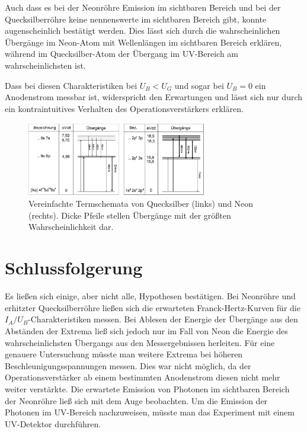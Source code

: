 \documentclass[
	a4paper,
	12pt,
	pagesize,
	ngerman
]{scrartcl}
\begin{document}
	Auch dass es bei der Neonröhre Emission im sichtbaren Bereich und bei der Quecksilberröhre keine nennenswerte im sichtbaren Bereich gibt, konnte augenscheinlich bestätigt werden.
	Dies lässt sich durch die wahrscheinlichen Übergänge im Neon-Atom mit Wellenlängen im sichtbaren Bereich erklären, während im Quecksilber-Atom der Übergang im UV-Bereich am wahrscheinlichsten ist.
	
	Dass bei diesen Charakteristiken bei $U_B < U_G$ und sogar bei $U_B=0$ ein Anodenstrom messbar ist, widerspricht den Erwartungen und lässt sich nur durch ein kontraintuitives Verhalten des Operationsverstärkers erklären.
	
	\begin{figure}[H]
		\includegraphics[width=0.7\textwidth]{Term}
		\centering
		\caption{Vereinfachte Termschemata von Quecksilber (links) und Neon
			(rechts). Dicke Pfeile stellen Übergänge mit der größten Wahrscheinlichkeit
			dar.\cite{Roehren} }
		\label{Term}
		\centering
	\end{figure}
	
	
	\section{Schlussfolgerung}
	Es ließen sich einige, aber nicht alle, Hypothesen bestätigen.
	Bei Neonröhre und erhitzter Quecksilberröhre ließen sich die erwarteten Franck-Hertz-Kurven für die $I_A/U_B$-Charakteristiken messen.
	Bei Ablesen der Energie der Übergänge aus den Abständen der Extrema ließ sich jedoch nur im Fall von Neon die Energie des wahrscheinlichsten Übergangs aus den Messergebnissen herleiten.
	Für eine genauere Untersuchung müsste man weitere Extrema bei höheren Beschleunigungsspannungen messen.
	Dies war nicht möglich, da der Operationsverstärker ab einem bestimmten Anodenstrom diesen nicht mehr weiter verstärkte.
	Die erwartete Emission von Photonen im sichtbaren Bereich der Neonröhre ließ sich mit dem Auge beobachten.
	Um die Emission der Photonen im UV-Bereich nachzuweisen, müsste man das Experiment mit einem UV-Detektor durchführen.
	
\end{document}
